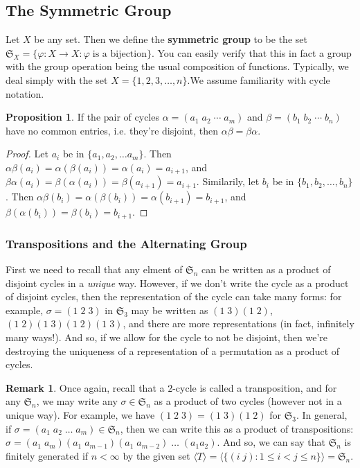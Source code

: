 \documentclass[9pt,reqno]{amsart}
\theoremstyle{definition}
\newtheorem{rem}{Remark}[section]
\newtheorem{prop}{Proposition}[section]
\begin{document}
\subsection{The Symmetric Group} Let $X$ be any set. Then we define the \textbf{symmetric group} to be the set \\ $\mathfrak{S}_X = \{ \varphi \colon X \to X \colon \varphi \; \text{is a bijection} \}$. You can easily verify that this in fact a group with the group operation being the usual composition of functions. Typically, we deal simply with the set $X = \{ 1, 2, 3, \ldots, n \}$.We assume familiarity with cycle notation.
\begin{prop}
	If the pair of cycles $\alpha= (a_1 \; a_2 \; \cdots \; a_m)$ and $\beta= (b_1 \; b_2 \; \cdots \; b_n)$ have no common entries, i.e. they're disjoint, then $\alpha \beta = \beta \alpha$. 
\end{prop} 
\begin{proof}
	Let $a_i$ be in $\{a_1, a_2, \ldots a_m \}$. Then $\alpha \beta (a_i) = \alpha (\beta (a_i)) = \alpha (a_i) = a_{i+1}$, and $\beta \alpha (a_i) = \beta (\alpha (a_i)) = \beta (a_{i+1}) = a_{i+1}$. Similarily, let $b_i$ be in $\{b_1, b_2, \ldots, b_n \}$. Then $\alpha \beta (b_i) = \alpha (\beta (b_i)) = \alpha (b_{i+1}) = b_{i+1}$, and $\beta (\alpha (b_i)) = \beta (b_i) = b_{i+1}$. 
\end{proof}
\subsubsection{Transpositions and the Alternating Group}
First we need to recall that any elment of $\mathfrak{S}_n$ can be written as a product of disjoint cycles in a \textit{unique} way. However, if we don't write the cycle as a product of disjoint cycles, then the representation of the cycle can take many forms: for example, $\sigma = (1 \; 2\; 3)$ in $\mathfrak{S}_3$ may be written as $ (1 \; 3) (1 \; 2)$, $(1 \; 2) (1 \; 3) (1 \; 2) (1 \;3)$, and there are more representations (in fact, infinitely many ways!). And so, if we allow for the cycle to not be disjoint, then we're destroying the uniqueness of a representation of a permutation as a product of cycles. 

\begin{rem}
Once again, recall that a $2$-cycle	is called a transposition, and for any $\mathfrak{S}_n$, we may write any $\sigma \in \mathfrak{S}_n$ as a product of two cycles (however not in a unique way). For example, we have $(1 \; 2 \; 3 ) = ( 1\; 3) (1 \; 2)$ for $\mathfrak{S}_3$. In general, if $\sigma = (a_1 \; a_2 \; \ldots \; a_m) \in \mathfrak{S}_n$, then we can write this as a product of transpositions: $\sigma = ( a_1 \; a_m) (a_1 \; a_{m-1} ) (a_1 \; a_{m-2}) \; \ldots \; (a_1 a_2)$. And so, we can say that $\mathfrak{S}_n$ is finitely generated if $n < \infty$ by the given set $\langle T \rangle = \langle \{ (i \; j ) \colon 1 \leq i < j \leq n \} \rangle = \mathfrak{S}_n$. 
\end{rem}
	
\end{document}
